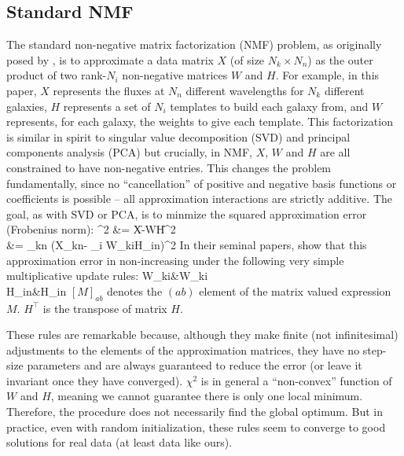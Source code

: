\documentclass[10pt,preprint]{aastex}
\def\beqa#1\eeqa{\begin{align}#1\end{align}}
\newcommand{\T}{^{\scriptscriptstyle \top}}
\newcommand{\XX}{X}
\newcommand{\XXh}{\hat{X}}
\newcommand{\Xkn}{X_{kn}}
\newcommand{\WW}{W}
\newcommand{\Wki}{W_{ki}}
\newcommand{\HH}{H}
\newcommand{\Hin}{H_{in}}
\begin{document}
\subsection{Standard NMF}
The standard non-negative matrix factorization (NMF) problem, as
originally posed by \cite{lee00a}, is to approximate a data
matrix $\XX$ (of size $N_k\times N_n$) as the outer product of two
rank-$N_i$ non-negative matrices $\WW$ and $\HH$. For example, in this
paper, $\XX$ represents the fluxes at $N_n$ different wavelengths for
$N_k$ different galaxies, $\HH$ represents a set of $N_i$ templates to build
each galaxy from, and $\WW$ represents, for each galaxy, the weights
to give each template. This factorization is similar in spirit to
singular value decomposition (SVD) and principal components analysis
(PCA) but crucially, in NMF, $\XX$, $\WW$ and $\HH$ are all
constrained to have non-negative entries. This changes the problem
fundamentally, since no ``cancellation'' of positive and negative
basis functions or coefficients is possible -- all approximation
interactions are strictly additive. The goal, as with SVD or PCA, is
to minmize the squared approximation error (Frobenius norm):
\beqa \label{eq:nmfcost}
\chi^2 &= \|\XX-\WW\HH\|^2\\
&= \sum_{kn} \left(\Xkn - \sum_i \Wki\Hin \right)^2
\eeqa
In their seminal papers, \cite{lee00a} show that this approximation
error in non-increasing under the following very simple multiplicative
update rules: 
\beqa \label{eq:wupdate}
\Wki &\leftarrow \Wki \frac{[\XX\HH\T]_{ki}}{[\WW\HH\HH\T]_{ki}}\\
\label{eq:hupdate}
\Hin &\leftarrow \Hin \frac{[\WW\T\XX]_{in}}{[\WW\T\WW\HH]_{in}}
\eeqa
$[M]_{ab}$ denotes the $(ab)$ element of the matrix valued expression
$M$. $\HH\T$ is the transpose of matrix $\HH$.

These rules are remarkable because, although they make finite (not
infinitesimal) adjustments to the elements of the approximation
matrices, they have no step-size parameters and are always guaranteed
to reduce the error (or leave it invariant once they have converged).
$\chi^2$ is in general a ``non-convex'' function of $\WW$ and $\HH$,
meaning we cannot guarantee there is only one local
minimum. Therefore, the procedure does not necessarily find the global
optimum. But in practice, even with random initialization, these rules
seem to converge to good solutions for real data (at least data like
ours).
\end{document}
